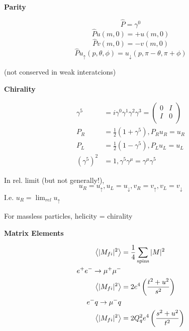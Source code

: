 \documentclass[10pt,letterpaper]{article}
\newcommand{\0}{\mathcal{O}}
\begin{document}
\begin{multicols}{3}
\textbf{Parity}

$$\hat{P} = \gamma^0$$
$$\hat{P}u(m,0) = +u(m,0)$$
$$\hat{P}v(m,0) = -v(m,0)$$
$$\hat{P}u_\uparrow(p,\theta,\phi) = u_\downarrow(p,\pi-\theta,\pi+\phi)$$

(not conserved in weak interatcions)

\textbf{Chirality}

\begin{align*}
    \gamma^5 &= i\gamma^0\gamma^1\gamma^2\gamma^3 = \begin{pmatrix}
        0 & I\\
        I & 0 \\
    \end{pmatrix}\\
    P_R &= \frac{1}{2}(1 + \gamma^5), P_R u_R = u_R \\
    P_L &= \frac{1}{2}(1 - \gamma^5), P_L u_L = u_L \\
    (\gamma^5)^2 &= 1, \gamma^5\gamma^\mu = \gamma^\mu\gamma^5
\end{align*}

In rel. limit (but not generally!),
$$u_R = u_\uparrow, u_L = u_\downarrow, v_R = v_\uparrow, v_L = v_\downarrow$$
I.e. $u_R = \lim_{rel} u_\uparrow$

For massless particles, helicity = chirality

\textbf{Matrix Elements}

\begin{align*}
    \expval{|M_{fi}|^2} &= \frac{1}{4} \sum_{\text{spins}} |M|^2 \\
    e^+e^- \to \mu^+\mu^- \\
    \expval{|M_{fi}|^2} &= 2e^4 \left(\frac{t^2+u^2}{s^2}\right) \\
    e^- q \to \mu^- q \\
    \expval{|M_{fi}|^2} &= 2Q_q^2 e^4 \left(\frac{s^2+u^2}{t^2}\right) \\
\end{align*}


\end{multicols}
\end{document}
